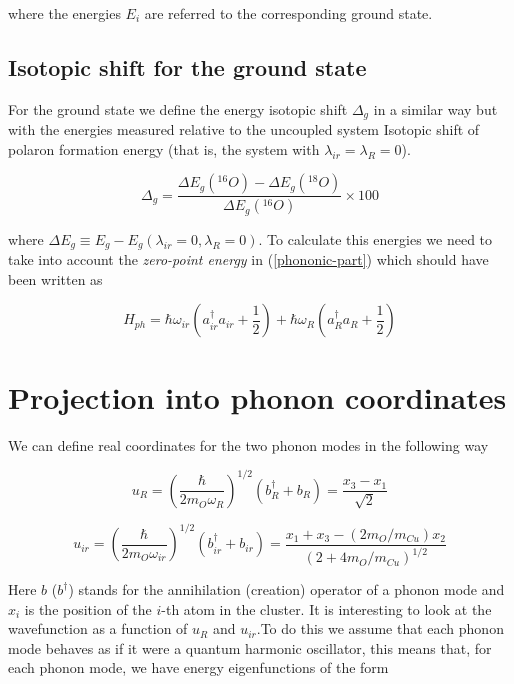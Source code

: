 where the energies $E_i$ are referred to the corresponding ground state.

\subsection{Isotopic shift for the ground state}

For the ground state we define the energy isotopic shift $\Delta_g$ in a similar way but with the energies measured relative to the uncoupled system Isotopic shift of polaron formation energy (that is, the system with $\lambda_{ir}=\lambda_R=0$).

\begin{equation}\label{isot-shift-def-grd}
\Delta_g = \frac{\Delta E_g(^{16}O)- \Delta E_g(^{18}O)}{\Delta E_g(^{16}O)} \times 100 \end{equation}

where $\Delta E_g \equiv E_g - E_g(\lambda_{ir}=0, \lambda_R=0)$. To calculate this energies we need to take into account the \textit{zero-point energy} in (\ref{phononic-part}) which should have been written as 

\begin{equation}\label{phononic-part-complete}
H_{ph} = \hbar \omega_{ir} \left( a_{ir}^\dagger a_{ir} + \frac{1}{2}\right) + \hbar \omega_R\left( a_R^\dagger a_R + \frac{1}{2} \right)\end{equation}


\section{Projection into phonon coordinates}

We can define real coordinates for the two phonon modes in the following way\cite{MustredeLeon1992}

\begin{equation}\label{uR} u_R = \left(\frac{\hbar}{2 m_O \omega_R}\right)^{1/2}(b_R^\dagger + b_R) = \frac{x_3 - x_1}{\sqrt{2}} \end{equation}

\begin{equation}\label{uir} u_{ir} = \left(\frac{\hbar}{2 m_O \omega_{ir}}\right)^{1/2}(b^\dagger_{ir}+b_{ir}) = \frac{ x_1 + x_3 - ( 2 m_O/m_{Cu})x_2}{(2 + 4 m_O/m_{Cu})^{1/2}} \end{equation}

Here $b$ ($b^\dagger$) stands for the annihilation (creation) operator of a phonon mode and $x_i$ is the position of the $i$-th atom in the cluster. It is interesting to look at the wavefunction as a function of $u_R$ and $u_{ir}$.To do this we assume that each phonon mode behaves as if it were a quantum harmonic oscillator, this means that, for each phonon mode, we have energy eigenfunctions of the form

